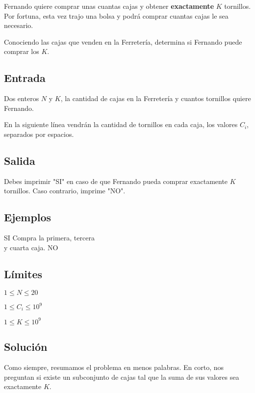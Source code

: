 Fernando quiere comprar unas cuantas cajas y obtener \textbf{exactamente} \(K\) tornillos. Por fortuna, esta vez trajo una bolsa y podrá comprar cuantas cajas le sea necesario.

Conociendo las cajas que venden en la Ferretería, determina si Fernando puede comprar los \(K\).

\subsection*{Entrada}
Dos enteros \(N\) y \(K\), la cantidad de cajas en la Ferretería y cuantos tornillos quiere Fernando.

En la siguiente línea vendrán la cantidad de tornillos en cada caja, los valores \(C_i\), separados por espacios.

\subsection*{Salida}
Debes imprimir "SI" en caso de que Fernando pueda comprar exactamente \(K\) tornillos. Caso contrario, imprime "NO".

\subsection*{Ejemplos}
\begin{casebox3}
	{SI}
	{
		Compra la primera, tercera\\
		y cuarta caja.
	}
	{NO}
	{}
\end{casebox3}
\subsection*{Límites}
\begin{plimits}
	\item \(1\leq N\leq 20 \)
	\item \(1\leq C_i\leq 10^9 \)
	\item \(1\leq K\leq 10^9 \)
\end{plimits}

\subsection*{Solución}

Como siempre, resumamos el problema en menos palabras. En corto, nos preguntan si existe un subconjunto de cajas tal que la suma de sus valores sea exactamente \(K\).

